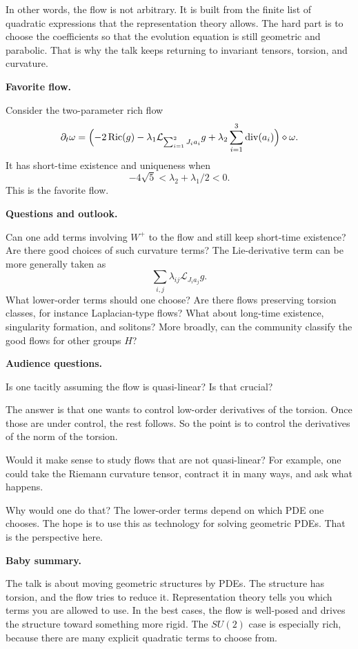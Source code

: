 \medskip\noindent
In other words, the flow is not
arbitrary.
It is built from the finite list of
quadratic expressions that the
representation theory allows.
The hard part is to choose the
coefficients so that the evolution
equation is still geometric and
parabolic.
That is why the talk keeps returning
to invariant tensors, torsion, and
curvature.

\medskip\noindent
{\bf Favorite flow.}

Consider the two-parameter rich flow
$$
        \partial_t\omega=
        \Bigl(
        -2\operatorname{Ric}(g)
        -\lambda_1\mathcal{L}_{
        \sum_{i=1}^2 J_i a_i}g
        +\lambda_2\sum_{i=1}^3
        \operatorname{div}(a_i)
        \Bigr)
        \diamond\omega .
$$
It has short-time existence and
uniqueness when
$$
        -4\sqrt 5<
        \lambda_2+\lambda_1/2<0 .
$$
This is the favorite flow.

\medskip\noindent
{\bf Questions and outlook.}

Can one add terms involving $W^+$
to the flow and still keep short-time
existence?
Are there good choices of such
curvature terms?
The Lie-derivative term can be more
generally taken as
$$
        \sum_{i,j}\lambda_{ij}
        \mathcal{L}_{J_i a_j}g.
$$
What lower-order terms should one
choose?
Are there flows preserving torsion
classes, for instance Laplacian-type
flows?
What about long-time existence,
singularity formation, and solitons?
More broadly, can the community
classify the good flows for other
groups $H$?

\medskip\noindent
{\bf Audience questions.}

Is one tacitly assuming the flow is
quasi-linear?
Is that crucial?

The answer is that one wants to
control low-order derivatives of the
torsion.
Once those are under control, the
rest follows.
So the point is to control the
derivatives of the norm of the
torsion.

Would it make sense to study flows
that are not quasi-linear?
For example, one could take the
Riemann curvature tensor, contract it
in many ways, and ask what happens.

Why would one do that?
The lower-order terms depend on which
PDE one chooses.
The hope is to use this as technology
for solving geometric PDEs.
That is the perspective here.

\medskip\noindent
{\bf Baby summary.}

The talk is about moving geometric
structures by PDEs.
The structure has torsion, and the
flow tries to reduce it.
Representation theory tells you which
terms you are allowed to use.
In the best cases, the flow is
well-posed and drives the structure
toward something more rigid.
The $SU(2)$ case is especially rich,
because there are many explicit
quadratic terms to choose from.

